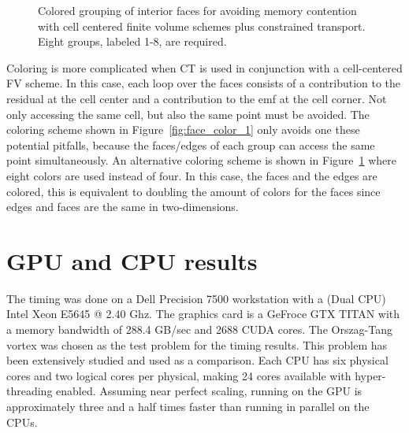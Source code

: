\begin{figure}[htbp]
\begin{center}

\end{center}
\caption{Colored grouping of interior faces for avoiding memory contention with cell centered finite volume schemes plus constrained transport.  Eight groups, labeled 1-8, are required.}
\label{fig:face_color_2}
\end{figure}

Coloring is more complicated when CT is used in conjunction with a cell-centered FV scheme.  In this case, each loop over the faces consists of a contribution to the residual at the cell center and a contribution to the emf at the cell corner.  Not only accessing the same cell, but also the same point must be avoided.  The coloring scheme shown in Figure~\ref{fig:face_color_1} only avoids one these potential pitfalls, because the faces/edges of each group can access the same point simultaneously.  An alternative coloring scheme is shown in Figure~\ref{fig:face_color_2} where eight colors are used instead of four.  In this case, the faces and the edges are colored,  this is equivalent to doubling the amount of colors for the faces since edges and faces are the same in two-dimensions.

\section[GPU and CPU results]{GPU and CPU results}
\label{sec:gpu_results}

The timing was done on a Dell Precision 7500 workstation with a (Dual CPU) Intel Xeon E5645 @ 2.40 Ghz.  The graphics card is a GeFroce GTX TITAN with a memory bandwidth of 288.4 GB/sec and 2688 CUDA cores.  The Orszag-Tang vortex \citep{Orszag:1979} was chosen as the test problem for the timing results.  This problem has been extensively studied and used as a comparison.  Each CPU has six physical cores and two logical cores per physical, making 24 cores available with hyper-threading enabled.  Assuming near perfect scaling, running on the GPU is approximately three and a half times faster than running in parallel on the CPUs.

